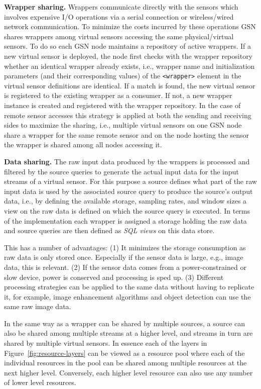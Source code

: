 \textbf{Wrapper sharing.} Wrappers communicate directly with the sensors which
involves expensive I/O operations via a serial connection or wireless/wired
network communication. To minimize the costs incurred by these operations GSN
shares wrappers among virtual sensors accessing the same physical/virtual
sensors. To do so each GSN node maintains a repository of active wrappers. If a
new virtual sensor is deployed, the node first checks with the wrapper
repository whether an identical wrapper already exists, i.e., wrapper name and
initialization parameters (and their corresponding values) of the \verb|<wrapper>| element in the virtual sensor
definitions are identical. If a match is found, the new virtual sensor is
registered to the existing wrapper as a consumer. If not, a new wrapper
instance is created and registered with the wrapper repository. In the case of
remote sensor accesses this strategy is applied at both the sending and
receiving sides to maximize the sharing, i.e., multiple virtual sensors on one
GSN node share a wrapper for the same remote sensor and on the node hosting the
sensor the wrapper is shared among all nodes accessing it.

\textbf{Data sharing.} The raw input data produced by the wrappers is processed
and filtered by the source queries to generate the actual input data for the
input streams of a virtual sensor. For this purpose a source defines
what part of the raw input data is used by the associated source query
to produce the source's output data, i.e., by defining the available
storage, sampling rates, and window sizes a view on the raw data is defined on
which the source query is executed. In terms of the implementation each
wrapper is assigned a storage holding the raw data and source queries
are then defined as \emph{SQL views} on this data store.

This has a number of advantages: (1) It minimizes the storage consumption as
raw data is only stored once. Especially if the sensor data is large, e.g.,
image data, this is relevant. (2) If the sensor data comes from a
power-constrained or slow device, power is conserved and processing is sped up.
(3) Different processing strategies can be applied to the same data without
having to replicate it, for example, image enhancement algorithms and object
detection can use the same raw image data.

In the same way as a wrapper can be shared by multiple sources, a source
can also be shared among multiple streams at a higher level, and
streams in turn are shared by multiple virtual sensors. In essence each
of the layers in Figure~\ref{fig:resource-layers} can be viewed as a resource
pool where each of the individual resources in the pool can be shared among
multiple resources at the next higher level. Conversely, each higher level
resource can also use any number of lower level resources.

